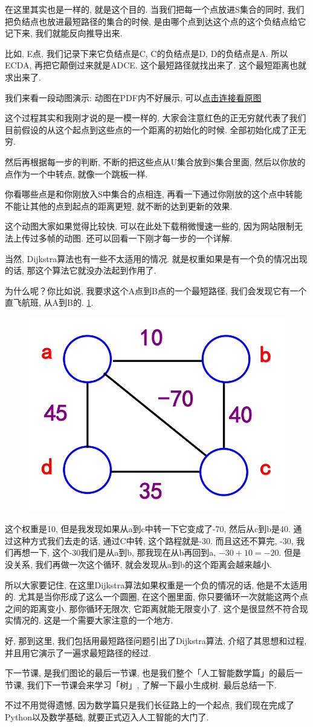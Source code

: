 在这里其实也是一样的, 就是这个目的. 当我们把每一个点放进S集合的同时, 我们把负结点也放进最短路径的集合的时候, 是由哪个点到达这个点的这个负结点给它记下来, 我们就能反向推导出来. 

比如, E点, 我们记录下来它负结点是C, C的负结点是D, D的负结点是A. 所以ECDA, 再把它颠倒过来就是ADCE. 这个最短路径就找出来了. 这个最短距离也就求出来了. 

我们来看一段动图演示: 动图在PDF内不好展示, 可以\href{https://raw.githubusercontent.com/hivandu/notes/main/img/20230924051227.gif}{点击连接看原图}

这个过程其实和我刚才说的是一模一样的, 大家会注意红色的正无穷就代表了我们目前假设的从这个起点到这些点的一个距离的初始化的时候. 全部初始化成了正无穷. 

然后再根据每一步的判断, 不断的把这些点从U集合放到S集合里面, 然后以你放的点作为一个中转点, 就像一个跳板一样. 

你看哪些点是和你刚放入S中集合的点相连, 再看一下通过你刚放的这个点中转能不能让其他的点到起点的距离更短, 就不断的达到更新的效果. 

这个动图大家如果觉得比较快, 可以在此处下载稍微慢速一些的, 因为网站限制无法上传过多帧的动图. 还可以回看一下刚才每一步的一个详解. 

当然, Dijkstra算法也有一些不太适用的情况. 就是权重如果是有一个负的情况出现的话, 那这个算法它就没办法起到作用了. 

为什么呢？你比如说, 我要求这个A点到B点的一个最短路径, 我们会发现它有一个直飞航班, 从A到B的. \ref{fig:img26_9}. 

\begin{figure}[ht]
  \centering
  \includegraphics[width=0.4\linewidth]{asset/20230924051228.jpg}
  \caption{}
  \label{fig:img26_9}
\end{figure}

这个权重是10, 但是我发现如果从a到c中转一下它变成了-70, 然后从c到b是40. 通过这种方式我们去走的话, 通过C中转, 这个路程就是-30. 而且这还不算完, -30, 我们再想一下, 这个-30我们是从a到b, 那我现在从b再回到a, $-30+10=-20$. 但是没关系, 我们再做一次这个循环, 就会发现从a到b的这个距离会越来越小. 

所以大家要记住, 在这里Dijkstra算法如果权重是一个负的情况的话, 他是不太适用的. 尤其是当你形成了这么一个圆圈, 在这个圈里面, 你只要循环一次就能这两个点之间的距离变小. 那你循环无限次, 它距离就能无限变小了. 这个是很显然不符合现实情况的. 这是一个需要大家注意的一个地方. 

好, 那到这里, 我们包括用最短路径问题引出了Dijkstra算法, 介绍了其思想和过程, 并且用它演示了一遍求最短路径的经过. 

下一节课, 是我们图论的最后一节课, 也是我们整个「人工智能数学篇」的最后一节课, 我们下一节课会来学习「树」, 了解一下最小生成树. 最后总结一下. 

不过不用觉得遗憾, 因为数学篇只是我们长征路上的一个起点, 我们现在完成了Python以及数学基础, 就要正式迈入人工智能的大门了. 